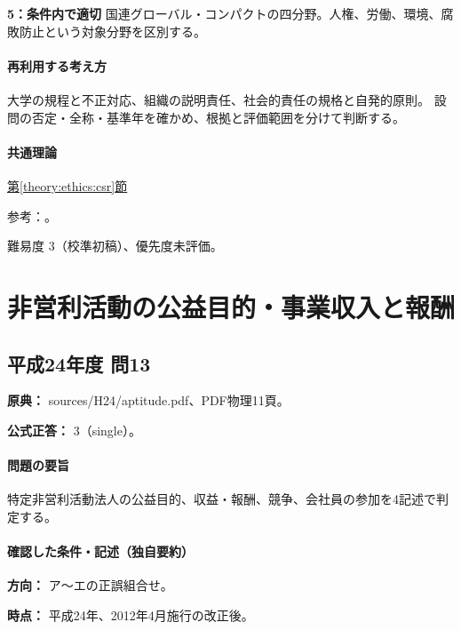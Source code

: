 \noindent\textbf{5：条件内で適切} 国連グローバル・コンパクトの四分野。人権、労働、環境、腐敗防止という対象分野を区別する。\par

\paragraph{再利用する考え方} 大学の規程と不正対応、組織の説明責任、社会的責任の規格と自発的原則。 設問の否定・全称・基準年を確かめ、根拠と評価範囲を分けて判断する。

\paragraph{共通理論} \hyperref[theory:ethics:csr]{第\ref*{theory:ethics:csr}節}

\par 参考：\cite{iso26000,eth54_globalcompact,eth54_university}。

\par 難易度 3（校準初稿）、優先度未評価。

\section{非営利活動の公益目的・事業収入と報酬}

\subsection{平成24年度 問13}
\label{q:h24-reg-apt-13}

\noindent\textbf{原典：} sources/H24/aptitude.pdf、PDF物理11頁。

\textbf{公式正答：} 3（single）。

\paragraph{問題の要旨} 特定非営利活動法人の公益目的、収益・報酬、競争、会社員の参加を4記述で判定する。

\paragraph{確認した条件・記述（独自要約）}\mbox{}\par

\noindent\textbf{方向：} ア〜エの正誤組合せ。\par

\noindent\textbf{時点：} 平成24年、2012年4月施行の改正後。\par

